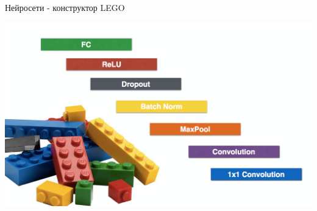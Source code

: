 \documentclass[notes,12pt, aspectratio=169]{beamer}
\DeclareMathOperator{\logloss}{logloss}
\begin{document}



\begin{frame}{Нейросети -  конструктор LEGO}
\begin{center}
	\includegraphics[width=0.8\paperwidth]{lego_lego.png}
\end{center}
\end{frame}
\end{document}
